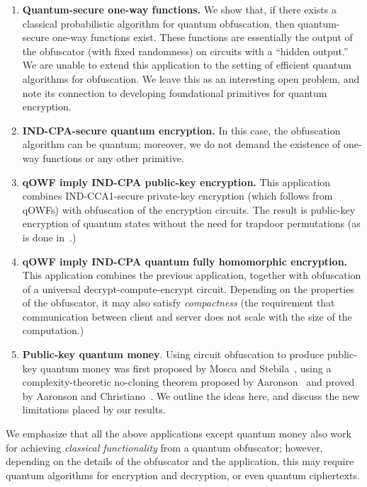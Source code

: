 \documentclass[11pt]{article}
\numberwithin{equation}{section}
\begin{document}
{\begin{enumerate}
\item \textbf{Quantum-secure one-way functions.} We show that, if there exists a classical probabilistic algorithm for quantum obfuscation, then quantum-secure one-way functions exist. These functions are essentially the output of the obfuscator (with fixed randomness) on circuits with a ``hidden output.'' We are unable to extend this application to the setting of efficient quantum algorithms for obfuscation. We leave this as an interesting open problem, and note its connection to developing foundational primitives for quantum encryption.
\item \textbf{IND-CPA-secure quantum encryption.} In this case, the obfuscation algorithm can be quantum; moreover, we do not demand the existence of one-way functions or any other primitive.
\item \textbf{qOWF imply IND-CPA public-key encryption.} This application combines IND-CCA1-secure private-key encryption (which follows from qOWFs) with obfuscation of the encryption circuits. The result is public-key encryption of quantum states without the need for trapdoor permutations (as is done in~\cite{ABFGSS15}.)
\item \textbf{qOWF imply IND-CPA quantum fully homomorphic encryption.} This application combines the previous application, together with obfuscation of a universal decrypt-compute-encrypt circuit. Depending on the properties of the obfuscator, it may also satisfy \emph{compactness} (the requirement that communication between client and server does not scale with the size of the computation.)
\item \textbf{Public-key quantum money}. Using circuit obfuscation to produce public-key quantum money was first proposed by Mosca and Stebila~\cite{MS10}, using a complexity-theoretic no-cloning theorem proposed by Aaronson~\cite{Aar09} and proved by Aaronson and Christiano~\cite{AC12}. We outline the ideas here, and discuss the new limitations placed by our results.
\end{enumerate}

We emphasize that all the above applications except quantum money also work for achieving \emph{classical functionality} from a quantum obfuscator; however, depending on the details of the obfuscator and the application, this may require quantum algorithms for encryption and decryption, or even quantum ciphertexts.

}
\end{document}
